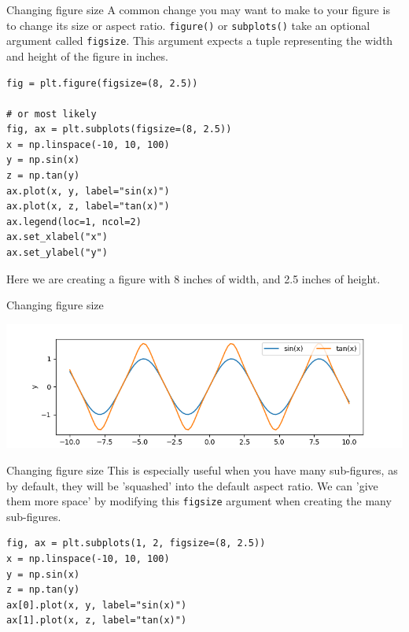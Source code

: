 \documentclass[10pt]{beamer}
\begin{document}
\begin{frame}[label={sec:org642a301},fragile]{Changing figure size}
 A common change you may want to make to your figure is to change its size or
aspect ratio. \texttt{figure()} or \texttt{subplots()} take an optional argument called
\texttt{figsize}. This argument expects a tuple representing the width and height of the
figure in inches.

\begin{verbatim}
fig = plt.figure(figsize=(8, 2.5))

# or most likely
fig, ax = plt.subplots(figsize=(8, 2.5))
x = np.linspace(-10, 10, 100)
y = np.sin(x)
z = np.tan(y)
ax.plot(x, y, label="sin(x)")
ax.plot(x, z, label="tan(x)")
ax.legend(loc=1, ncol=2)
ax.set_xlabel("x")
ax.set_ylabel("y")
\end{verbatim}

Here we are creating a figure with 8 inches of width, and 2.5 inches of height.
\end{frame}

\begin{frame}[label={sec:org17f2396}]{Changing figure size}
\begin{center}
\includegraphics[width=.9\linewidth]{images/fig-size.png}
\end{center}
\end{frame}

\begin{frame}[label={sec:org9708adf},fragile]{Changing figure size}
 This is especially useful when you have many sub-figures, as by default, they
will be 'squashed' into the default aspect ratio. We can 'give them more space'
by modifying this \texttt{figsize} argument when creating the many sub-figures.

\begin{verbatim}
fig, ax = plt.subplots(1, 2, figsize=(8, 2.5))
x = np.linspace(-10, 10, 100)
y = np.sin(x)
z = np.tan(y)
ax[0].plot(x, y, label="sin(x)")
ax[1].plot(x, z, label="tan(x)")
\end{verbatim}
\end{frame}
\end{document}
